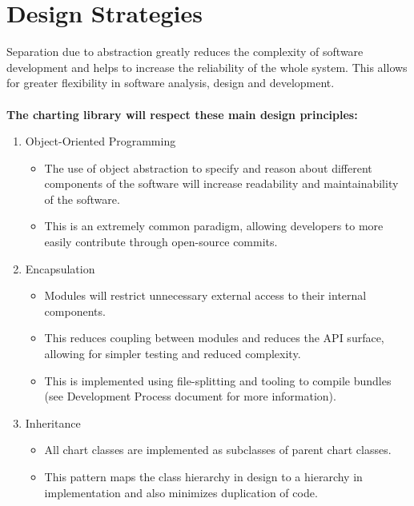 \documentclass[12pt, titlepage]{article}
\begin{document}
\section{Design Strategies}
Separation due to abstraction greatly reduces the complexity of software development and helps to increase the reliability of the whole system. This allows for greater flexibility in software analysis, design and development. \\
\\
\textbf{The charting library will respect these main design principles:}
\begin{enumerate}
    \item Object-Oriented Programming
        \begin{itemize}
            \item The use of object abstraction to specify and reason about different components of the software will increase readability and maintainability of the software.
            \item This is an extremely common paradigm, allowing developers to more easily contribute through open-source commits.
        \end{itemize}
    \item Encapsulation
    \begin{itemize}
        \item Modules will restrict unnecessary external access to their internal components.
        \item This reduces coupling between modules and reduces the API surface, allowing for simpler testing and reduced complexity.
        \item This is implemented using file-splitting and tooling to compile bundles (see Development Process document for more information). 
    \end{itemize}
    \item Inheritance
    \begin{itemize}
        \item All chart classes are implemented as subclasses of parent chart classes.
        \item This pattern maps the class hierarchy in design to a hierarchy in implementation and also minimizes duplication of code. \\
    \end{itemize}
\end{enumerate}


\end{document}
